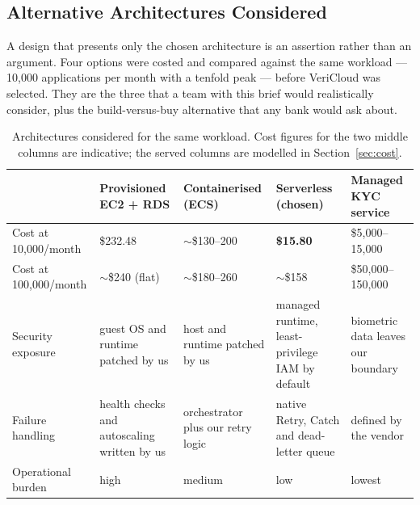 %
%      
\subsection{Alternative Architectures Considered}\label{sec:alt}

A design that presents only the chosen architecture is an assertion rather than
an argument. Four options were costed and compared against the same workload ---
10{,}000 applications per month with a tenfold peak --- before VeriCloud was
selected. They are the three that a team with this brief would realistically
consider, plus the build-versus-buy alternative that any bank would ask about.

\begin{table}[htbp]
  \centering
  \scriptsize
  \caption{Architectures considered for the same workload. Cost figures for the
           two middle columns are indicative; the served columns are modelled in
           Section~\ref{sec:cost}.}
  \label{tab:alt}
  \begin{tabular}{@{}p{2.7cm}p{3.0cm}p{3.0cm}p{3.0cm}p{3.0cm}@{}}
    \toprule
     & Provisioned EC2 + RDS & Containerised (ECS) & \textbf{Serverless (chosen)} & Managed KYC service \\
    \midrule
    Cost at 10{,}000/month
      & \$232.48 & $\sim$\$130--200 & \textbf{\$15.80} & \$5{,}000--15{,}000 \\
    Cost at 100{,}000/month
      & $\sim$\$240 (flat) & $\sim$\$180--260 & $\sim$\$158 & \$50{,}000--150{,}000 \\
    Security exposure
      & guest OS and runtime patched by us & host and runtime patched by us & managed runtime, least-privilege IAM by default & biometric data leaves our boundary \\
    Failure handling
      & health checks and autoscaling written by us & orchestrator plus our retry logic & native Retry, Catch and dead-letter queue & defined by the vendor \\
    Operational burden
      & high & medium & low & lowest \\
    \bottomrule
  \end{tabular}
\end{table}

